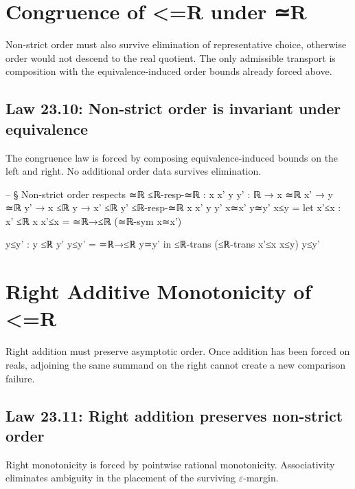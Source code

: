 \documentclass[11pt,a4paper]{book}
\def\mathbb#1{#1}%
\def\texorpdfstring#1#2{#2}%
\begin{document}
\section{Congruence of \texorpdfstring{$\le_{\mathbb{R}}$}{<=R} under \texorpdfstring{$\simeq_{\mathbb{R}}$}{≃R}}

Non-strict order must also survive elimination of representative choice, otherwise order would not descend to the real quotient. The only admissible transport is composition with the equivalence-induced order bounds already forced above.

\subsection*{Law 23.10: Non-strict order is invariant under equivalence}

The congruence law is forced by composing equivalence-induced bounds on the left and right. No additional order data survives elimination.

\begin{code}
-- § Non-strict order respects ≃ℝ
≤ℝ-resp-≃ℝ : {x x' y y' : ℝ} → x ≃ℝ x' → y ≃ℝ y' → x ≤ℝ y → x' ≤ℝ y'
≤ℝ-resp-≃ℝ {x} {x'} {y} {y'} x≃x' y≃y' x≤y =
  let
    x'≤x : x' ≤ℝ x
    x'≤x = ≃ℝ→≤ℝ (≃ℝ-sym x≃x')

    y≤y' : y ≤ℝ y'
    y≤y' = ≃ℝ→≤ℝ y≃y'
  in
  ≤ℝ-trans (≤ℝ-trans x'≤x x≤y) y≤y'
\end{code}


\section{Right Additive Monotonicity of \texorpdfstring{$\le_{\mathbb{R}}$}{<=R}}

Right addition must preserve asymptotic order. Once addition has been forced on reals, adjoining the same summand on the right cannot create a new comparison failure.

\subsection*{Law 23.11: Right addition preserves non-strict order}

Right monotonicity is forced by pointwise rational monotonicity. Associativity eliminates ambiguity in the placement of the surviving $\varepsilon$-margin.
\end{document}
